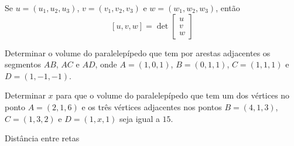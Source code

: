 \begin{frame}[label=produtovetorial]{}
	
\begin{prop}
	Se $u=(u_1,u_2,u_3)$, $v=(v_1,v_2,v_3)$ e $w=(w_1,w_2,w_3)$, então
\[[u,v,w]=\det
\begin{bmatrix}
	u\\
	v\\
	w
\end{bmatrix}
\]
\end{prop}
\begin{exe}
Determinar o volume do paralelepípedo que tem por arestas adjacentes os segmentos $AB$, $AC$ e $AD$, onde $A=(1,0,1)$, $B=(0,1,1)$, $C=(1,1,1)$ e $D=(1,-1,-1)$.
\end{exe}
\end{frame}

\begin{frame}[label=produtovetorial]{}
\begin{casa}
	Determinar $x$ para que o volume do paralelepípedo que tem um dos vértices no ponto $A=(2,1,6)$ e os três vértices adjacentes nos pontos $B=(4,1,3)$, $C=(1,3,2)$ e $D=(1,x,1)$ seja igual a $15$.
\end{casa}
	
\end{frame}

\begin{frame}[label=produtovetorial]{Distância entre retas}



	
\end{frame}




